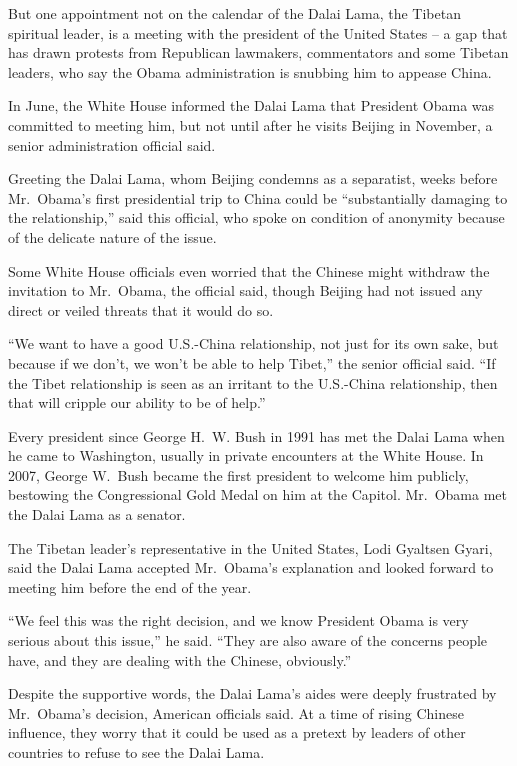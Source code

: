 ﻿\documentclass[12pt]{article}
\begin{document}
But one appointment not on the calendar of the Dalai Lama, the Tibetan spiritual leader, is a
meeting with the president of the United States -- a gap that has drawn protests from Republican
lawmakers, commentators and some Tibetan leaders, who say the Obama administration is snubbing him
to appease China.

In June, the White House informed the Dalai Lama that President Obama was committed to meeting him,
but not until after he visits Beijing in November, a senior administration official said.

Greeting the Dalai Lama, whom Beijing condemns as a separatist, weeks before Mr.~Obama's first
presidential trip to China could be ``substantially damaging to the relationship,'' said this
official, who spoke on condition of anonymity because of the delicate nature of the issue.

Some White House officials even worried that the Chinese might withdraw the invitation to Mr.~Obama,
the official said, though Beijing had not issued any direct or veiled threats that it would do so.

``We want to have a good U.S.-China relationship, not just for its own sake, but because if we
don't, we won't be able to help Tibet,'' the senior official said. ``If the Tibet relationship is
seen as an irritant to the U.S.-China relationship, then that will cripple our ability to be of
help.''

Every president since George H.~W. Bush in 1991 has met the Dalai Lama when he came to Washington,
usually in private encounters at the White House. In 2007, George W.~Bush became the first president
to welcome him publicly, bestowing the Congressional Gold Medal on him at the Capitol. Mr.~Obama met
the Dalai Lama as a senator.

The Tibetan leader's representative in the United States, Lodi Gyaltsen Gyari, said the Dalai Lama
accepted Mr.~Obama's explanation and looked forward to meeting him before the end of the year.

``We feel this was the right decision, and we know President Obama is very serious about this
issue,'' he said. ``They are also aware of the concerns people have, and they are dealing with the
Chinese, obviously.''

Despite the supportive words, the Dalai Lama's aides were deeply frustrated by Mr.~Obama's decision,
American officials said. At a time of rising Chinese influence, they worry that it could be used as
a pretext by leaders of other countries to refuse to see the Dalai Lama.
\end{document}
